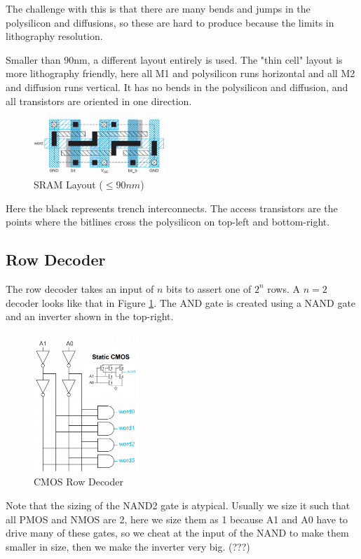 \documentclass{article}
\begin{document}
The challenge with this is that there are many bends and jumps in the polysilicon and diffusions, so these are hard to produce because the limits in lithography resolution.

Smaller than 90nm, a different layout entirely is used. The "thin cell" layout is more lithography friendly, here all M1 and polysilicon runs horizontal and all M2 and diffusion runs vertical. It has no bends in the polysilicon and diffusion, and all transistors are oriented in one direction.

\begin{figure}[ht!]
\centering
\includegraphics[width=50mm]{SRAMLayout2.png}
\caption{SRAM Layout ($\le 90nm$)}
\end{figure}

Here the black represents trench interconnects. The access transistors are the points where the bitlines cross the polysilicon on top-left and bottom-right. 



\subsection{Row Decoder}

The row decoder takes an input of $n$ bits to assert one of $2^n$ rows. A $n=2$ decoder looks like that in Figure \ref{RowDecoder1}. The AND gate is created using a NAND gate and an inverter shown in the top-right.

\begin{figure}[ht!]
\centering
\includegraphics[width=40mm]{RowDecoder.png}
\caption{CMOS Row Decoder}
\label{RowDecoder1}
\end{figure}

 Note that the sizing of the NAND2 gate is atypical. Usually we size it such that all PMOS and NMOS are 2, here we size them as 1 because A1 and A0 have to drive many of these gates, so we cheat at the input of the NAND to make them smaller in size, then we make the inverter very big. (???)
 
\end{document}
